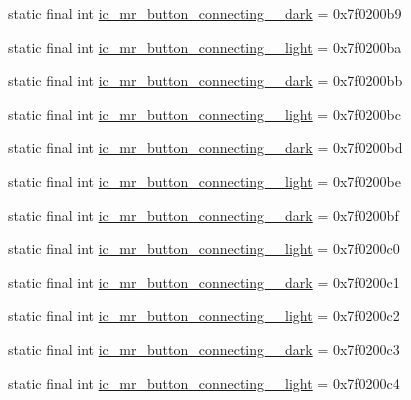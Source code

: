 \begin{CompactItemize}
\item 
static final int \hyperlink{classandroid_1_1support_1_1v7_1_1appcompat_1_1_r_1_1drawable_04191a1dae0b86862e2a1377cc41f292}{ic\_\-mr\_\-button\_\-connecting\_\_\-dark} = 0x7f0200b9
\item 
static final int \hyperlink{classandroid_1_1support_1_1v7_1_1appcompat_1_1_r_1_1drawable_c6934cb9898c9a330cb9c52e3f4d9794}{ic\_\-mr\_\-button\_\-connecting\_\_\-light} = 0x7f0200ba
\item 
static final int \hyperlink{classandroid_1_1support_1_1v7_1_1appcompat_1_1_r_1_1drawable_9500ac77a40f63919819db9e99bc722d}{ic\_\-mr\_\-button\_\-connecting\_\_\-dark} = 0x7f0200bb
\item 
static final int \hyperlink{classandroid_1_1support_1_1v7_1_1appcompat_1_1_r_1_1drawable_4c94bd06375c559769e97a4805c3ee08}{ic\_\-mr\_\-button\_\-connecting\_\_\-light} = 0x7f0200bc
\item 
static final int \hyperlink{classandroid_1_1support_1_1v7_1_1appcompat_1_1_r_1_1drawable_17900df8f30d2e462cbacac36c2b4e40}{ic\_\-mr\_\-button\_\-connecting\_\_\-dark} = 0x7f0200bd
\item 
static final int \hyperlink{classandroid_1_1support_1_1v7_1_1appcompat_1_1_r_1_1drawable_4e7c597713696ad3d7d24cc249b7f870}{ic\_\-mr\_\-button\_\-connecting\_\_\-light} = 0x7f0200be
\item 
static final int \hyperlink{classandroid_1_1support_1_1v7_1_1appcompat_1_1_r_1_1drawable_b2324d3d851170b1748f108e559fd775}{ic\_\-mr\_\-button\_\-connecting\_\_\-dark} = 0x7f0200bf
\item 
static final int \hyperlink{classandroid_1_1support_1_1v7_1_1appcompat_1_1_r_1_1drawable_9800a8ef89aa776413cec590feca1654}{ic\_\-mr\_\-button\_\-connecting\_\_\-light} = 0x7f0200c0
\item 
static final int \hyperlink{classandroid_1_1support_1_1v7_1_1appcompat_1_1_r_1_1drawable_58b5b6285b1e528007b4acf830909550}{ic\_\-mr\_\-button\_\-connecting\_\_\-dark} = 0x7f0200c1
\item 
static final int \hyperlink{classandroid_1_1support_1_1v7_1_1appcompat_1_1_r_1_1drawable_a6a2deaba6d8f93216d899c983fcd6e7}{ic\_\-mr\_\-button\_\-connecting\_\_\-light} = 0x7f0200c2
\item 
static final int \hyperlink{classandroid_1_1support_1_1v7_1_1appcompat_1_1_r_1_1drawable_c1b15820db1867ab0d7cb3d6b0fe1678}{ic\_\-mr\_\-button\_\-connecting\_\_\-dark} = 0x7f0200c3
\item 
static final int \hyperlink{classandroid_1_1support_1_1v7_1_1appcompat_1_1_r_1_1drawable_de5321511fb982ddb489b779308e6f0e}{ic\_\-mr\_\-button\_\-connecting\_\_\-light} = 0x7f0200c4

\end{CompactItemize}
